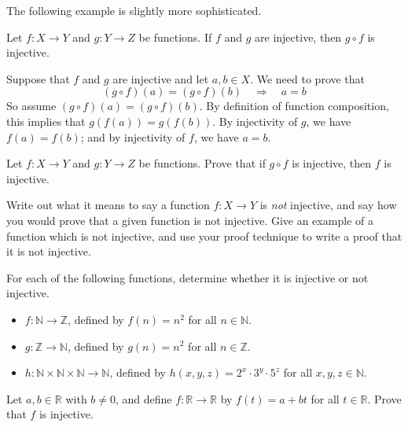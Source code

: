 The following example is slightly more sophisticated.

\begin{proposition}
\label{propCompositeOfInjectionsIsInjection}
Let $f : X \to Y$ and $g : Y \to Z$ be functions. If $f$ and $g$ are injective, then $g \circ f$ is injective.
\end{proposition}
\begin{cproof}
Suppose that $f$ and $g$ are injective and let $a,b \in X$. We need to prove that
\[ (g \circ f)(a) = (g \circ f)(b) \quad \Rightarrow \quad a=b \]
So assume $(g \circ f)(a) = (g \circ f)(b)$. By definition of function composition, this implies that $g(f(a))=g(f(b))$. By injectivity of $g$, we have $f(a)=f(b)$; and by injectivity of $f$, we have $a=b$.
\end{cproof}

\begin{exercise}
Let $f : X \to Y$ and $g : Y \to Z$ be functions. Prove that if $g \circ f$ is injective, then $f$ is injective.
\end{exercise}

\begin{exercise}
Write out what it means to say a function $f : X \to Y$ is \textit{not} injective, and say how you would prove that a given function is not injective. Give an example of a function which is not injective, and use your proof technique to write a proof that it is not injective.
\end{exercise}

\begin{exercise}
For each of the following functions, determine whether it is injective or not injective.
\begin{itemize} 
\item $f : \mathbb{N} \to \mathbb{Z}$, defined by $f(n)=n^2$ for all $n \in \mathbb{N}$.
\item $g : \mathbb{Z} \to \mathbb{N}$, defined by $g(n)=n^2$ for all $n \in \mathbb{Z}$.
\item $h : \mathbb{N} \times \mathbb{N} \times \mathbb{N} \to \mathbb{N}$, defined by $h(x,y,z) = 2^x \cdot 3^y \cdot 5^z$ for all $x,y,z \in \mathbb{N}$.
\end{itemize}
\end{exercise}

\begin{exercise}
\label{exLinearPolynomialIsInjective}
Let $a,b \in \mathbb{R}$ with $b \ne 0$, and define $f : \mathbb{R} \to \mathbb{R}$ by $f(t) = a+bt$ for all $t \in \mathbb{R}$. Prove that $f$ is injective.
\end{exercise}


